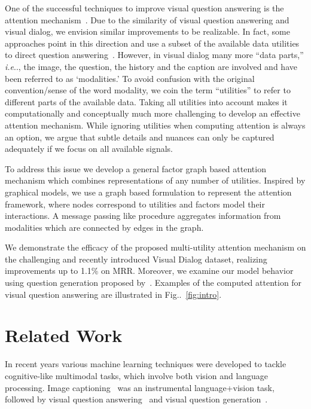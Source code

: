 \documentclass[10pt,twocolumn,letterpaper]{article}
\makeatletter
\def\@onedot{\ifx\@let@token.\else.\null\fi\xspace}
\DeclareRobustCommand\onedot{\futurelet\@let@token\@onedot}
\newcommand{\figref}[1]{Fig\onedot~\ref{#1}}
\def\ie{\emph{i.e}\onedot} \def\Ie{\emph{I.e}\onedot}
\makeatother
\begin{document}
One of the  successful techniques to improve visual question answering is the attention  mechanism~\cite{lu2016hierarchical}.                                                                                  Due to the similarity of visual question answering and visual dialog, we envision similar improvements to be realizable. In fact, some approaches point in this direction and use a subset of the available data utilities to direct question answering~\cite{lu2017best}. 
However, in visual dialog many more ``data parts,'' \ie, the image, the question, the history and the caption are involved and have been referred to as `modalities.' To avoid confusion with the original convention/sense of the word modality, we coin the term ``utilities'' to refer to different parts of the available data.   Taking all utilities  into account makes it computationally and conceptually much more challenging to develop an effective attention mechanism. While ignoring utilities when computing attention is always an option, we argue that subtle details and nuances can only be captured adequately if we focus on all available signals. 

To address this issue we develop a general factor graph based attention mechanism which combines representations of any number of utilities. Inspired by graphical models, we use a graph based formulation to represent the attention framework, where nodes correspond to utilities  and factors model their interactions. A message passing like procedure aggregates information from modalities which are connected by edges in the graph. 

We demonstrate the efficacy of the proposed multi-utility attention mechanism on the challenging and recently introduced Visual Dialog dataset, realizing improvements up to 1.1\% on MRR. 
Moreover, we examine our model behavior using question generation proposed by~\cite{jain2018two}.    Examples of the computed attention for visual question answering are illustrated in \figref{fig:intro}. 



 \section{Related Work}
In recent years various machine learning techniques were developed to tackle cognitive-like multimodal tasks, which involve both vision and language processing. Image captioning~\cite{MaoARXIV2014,show_attend_tell,KarpathyCVPR2015,WangNIPS2017,ChatterjeeECCV2018,AnejaCVPR2018,DeshpandeARXIV2018} was an instrumental language+vision task, followed by visual question answering~\cite{lu2016hierarchical, SchwartzNIPS2017, kim2016hadamard,MalinowskiNIPS2014, RenNIPS2015,AnatolICCV2015,GaoNIPS2015,ZhuCVPR2016, JohnsonCVPR2017Clevr,AndreasCVPR2016,DasARXIV2016,FukuiARXIV2016,ShihCVPR2016,XuARXIV2015,SchwartzNIPS2017,XiongICML2016,NarasimhanNIPS2018,NarasimhanECCV2018,SchwartzCVPR2019} and visual question generation~\cite{RenNIPS2015,VQG,JainCVPR2017,VijayakumarARXIV2016,LiARXIV2017DualVQAVQG,BenyounesICCV2017Mutan}. 
\end{document}
